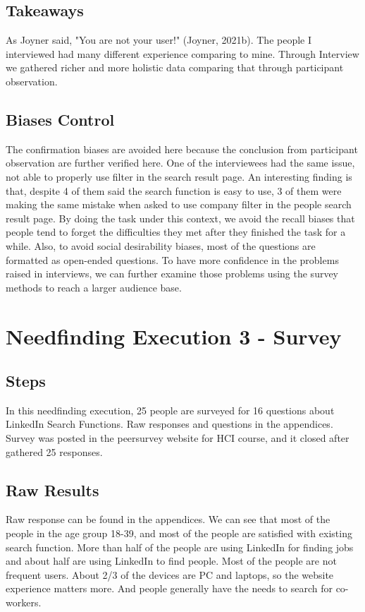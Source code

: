 \documentclass[
	letterpaper, %
]{jdf}
\begin{document}
\subsection{Takeaways}
As Joyner said, "You are not your user!" (Joyner, 2021b). The people I interviewed had many different experience comparing to mine. Through Interview we gathered richer and more holistic data comparing that through participant observation. 

\subsection{Biases Control}
The confirmation biases are avoided here because the conclusion from participant observation are further verified here. One of the interviewees had the same issue, not able to properly use filter in the search result page. An interesting finding is that, despite 4 of them said the search function is easy to use, 3 of them were making the same mistake when asked to use company filter in the people search result page. By doing the task under this context, we avoid the recall biases that people tend to forget the difficulties they met after they finished the task for a while. Also, to avoid social desirability biases, most of the questions are formatted as open-ended questions. To have more confidence in the problems raised in interviews, we can further examine those problems using the survey methods to reach a larger audience base.

\section{Needfinding Execution 3 - Survey}
\subsection{Steps}
In this needfinding execution, 25 people are surveyed for 16 questions about LinkedIn Search Functions. Raw responses and questions in the appendices. Survey was posted in the peersurvey website for HCI course, and it closed after gathered 25 responses.

\subsection{Raw Results}
Raw response can be found in the appendices. We can see that most of the people in the age group 18-39, and most of the people are satisfied with existing search function. More than half of the people are using LinkedIn for finding jobs and about half are using LinkedIn to find people. Most of the people are not frequent users. About 2/3 of the devices are PC and laptops, so the website experience matters more. And people generally have the needs to search for co-workers.
\end{document}
